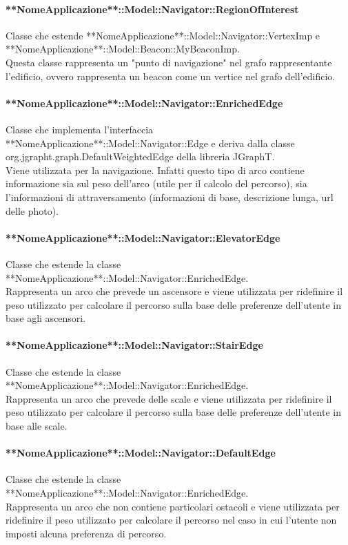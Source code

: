 \documentclass[../SpecificaTecnica.tex]{subfiles}
\begin{document}
				\paragraph{**NomeApplicazione**::Model::Navigator::RegionOfInterest}
					Classe che estende **NomeApplicazione**::Model::Navigator::VertexImp e **NomeApplicazione**::Model::Beacon::MyBeaconImp. \\
					Questa classe rappresenta un "punto di navigazione" nel grafo rappresentante l'edificio, ovvero rappresenta un beacon come un vertice nel grafo dell'edificio.
				\paragraph{**NomeApplicazione**::Model::Navigator::EnrichedEdge}
					Classe che implementa l'interfaccia **NomeApplicazione**::Model::Navigator::Edge e deriva dalla classe org.jgrapht.graph.DefaultWeightedEdge della libreria JGraphT. \\
					Viene utilizzata per la navigazione. Infatti questo tipo di arco contiene informazione sia sul peso dell'arco (utile per il calcolo del percorso), sia l'informazioni di attraversamento (informazioni di base, descrizione lunga, url delle photo).
				\paragraph{**NomeApplicazione**::Model::Navigator::ElevatorEdge}
					Classe che estende la classe **NomeApplicazione**::Model::Navigator::EnrichedEdge. \\
					Rappresenta un arco che prevede un ascensore e viene utilizzata per ridefinire il peso utilizzato per calcolare il percorso sulla base delle preferenze dell'utente in base agli ascensori.
				\paragraph{**NomeApplicazione**::Model::Navigator::StairEdge}
					Classe che estende la classe **NomeApplicazione**::Model::Navigator::EnrichedEdge. \\
					Rappresenta un arco che prevede delle scale e viene utilizzata per ridefinire il peso utilizzato per calcolare il percorso sulla base delle preferenze dell'utente in base alle scale.
				\paragraph{**NomeApplicazione**::Model::Navigator::DefaultEdge}
					Classe che estende la classe **NomeApplicazione**::Model::Navigator::EnrichedEdge. \\
					Rappresenta un arco che non contiene particolari ostacoli e viene utilizzata per ridefinire il peso utilizzato per calcolare il percorso nel caso in cui l'utente non imposti alcuna preferenza di percorso.
\end{document}
